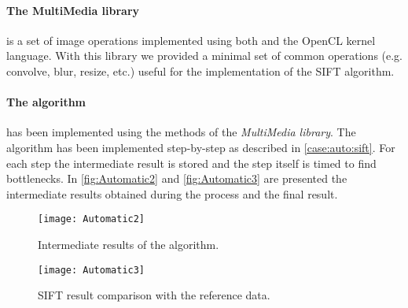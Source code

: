 \paragraph{The MultiMedia library} is a set of image operations implemented using
both \js{} and the OpenCL kernel language. With this library we provided a minimal
set of common operations (e.g. convolve, blur, resize, etc.) useful for the
implementation of the \ac{SIFT} algorithm.\\

\paragraph{The algorithm} has been implemented using the methods of the
\emph{MultiMedia library}. The algorithm has been implemented step-by-step
as described in \ref{case:auto:sift}. For each step the intermediate result
is stored and the step itself is timed to find bottlenecks. In
\autoref{fig:Automatic2} and \autoref{fig:Automatic3} are presented the
intermediate results obtained during the process and the final result.
\begin{figure}[htb]
    \centering
    \texttt{[image: Automatic2]}
    \caption{Intermediate results of the algorithm.}
    \label{fig:Automatic2}
\end{figure}

\begin{figure}[htb]
    \centering
    \texttt{[image: Automatic3]}
    \caption{\acs{SIFT} result comparison with the reference data.}
    \label{fig:Automatic3}
\end{figure}





